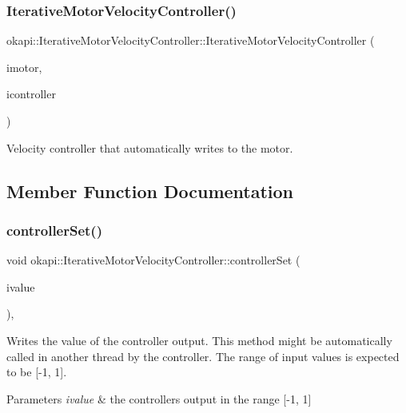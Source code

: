 \subsubsection{\texorpdfstring{IterativeMotorVelocityController()}{IterativeMotorVelocityController()}}
{\footnotesize\ttfamily okapi\+::\+Iterative\+Motor\+Velocity\+Controller\+::\+Iterative\+Motor\+Velocity\+Controller (\begin{DoxyParamCaption}\item[{const std\+::shared\+\_\+ptr$<$ \mbox{\hyperlink{classokapi_1_1AbstractMotor}{Abstract\+Motor}} $>$ \&}]{imotor,  }\item[{const std\+::shared\+\_\+ptr$<$ \mbox{\hyperlink{classokapi_1_1IterativeVelocityController}{Iterative\+Velocity\+Controller}}$<$ double, double $>$$>$ \&}]{icontroller }\end{DoxyParamCaption})}

Velocity controller that automatically writes to the motor. 

\subsection{Member Function Documentation}
\mbox{\label{classokapi_1_1IterativeMotorVelocityController_a5a36064df12b3d34f2bfa09ca1992b9e}} 
\subsubsection{\texorpdfstring{controllerSet()}{controllerSet()}}
{\footnotesize\ttfamily void okapi\+::\+Iterative\+Motor\+Velocity\+Controller\+::controller\+Set (\begin{DoxyParamCaption}\item[{double}]{ivalue }\end{DoxyParamCaption})\hspace{0.3cm}{\ttfamily [override]}, {\ttfamily [virtual]}}

Writes the value of the controller output. This method might be automatically called in another thread by the controller. The range of input values is expected to be \mbox{[}-\/1, 1\mbox{]}.


\begin{DoxyParams}{Parameters}
{\em ivalue} & the controller\textquotesingle{}s output in the range \mbox{[}-\/1, 1\mbox{]} \\
\hline
\end{DoxyParams}


